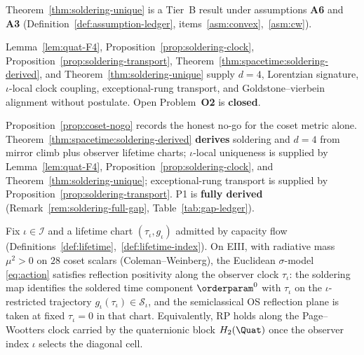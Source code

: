 \begin{remark}
\label{rem:soldering-tier}
Theorem~\ref{thm:soldering-unique} is a Tier~B result under assumptions
\textbf{A6} and \textbf{A3} (Definition~\ref{def:assumption-ledger},
items~\ref{asm:convex},~\ref{asm:cw}).
\end{remark}

\begin{remark}
\label{rem:soldering-full-gap}
Lemma~\ref{lem:quat-F4}, Proposition~\ref{prop:soldering-clock},
Proposition~\ref{prop:soldering-transport},
Theorem~\ref{thm:spacetime:soldering-derived}, and
Theorem~\ref{thm:soldering-unique} supply $d=4$, Lorentzian signature,
$\iota$-local clock coupling, exceptional-rung transport, and
Goldstone--vierbein alignment without postulate. Open Problem~\textbf{O2} is
\textbf{closed}.
\end{remark}

\begin{remark}
Proposition~\ref{prop:coset-nogo} records the honest no-go for the coset
metric alone. Theorem~\ref{thm:spacetime:soldering-derived} \textbf{derives}
soldering and $d=4$ from mirror climb plus observer lifetime charts;
$\iota$-local uniqueness is supplied by Lemma~\ref{lem:quat-F4},
Proposition~\ref{prop:soldering-clock}, and
Theorem~\ref{thm:soldering-unique}; exceptional-rung transport is supplied
by Proposition~\ref{prop:soldering-transport}. P1 is \textbf{fully derived}
(Remark~\ref{rem:soldering-full-gap}, Table~\ref{tab:gap-ledger}).
\end{remark}

\begin{theorem}
\label{thm:rp}
Fix $\iota\in\mathcal{I}$ and a lifetime chart
$(\tau_\iota,g_\iota)$ admitted by capacity flow
(Definitions~\ref{def:lifetime},~\ref{def:lifetime-index}). On EIII, with
radiative mass $\mu^2>0$ on $28$ coset scalars (Coleman--Weinberg), the
Euclidean $\sigma$-model \eqref{eq:action} satisfies reflection positivity
along the observer clock $\tau_\iota$: the soldering map identifies the
soldered time component $\orderparam^0$ with $\tau_\iota$ on the
$\iota$-restricted trajectory $g_\iota(\tau_\iota)\in\mathcal{S}_\iota$, and
the semiclassical OS reflection plane is taken at fixed $\tau_\iota=0$ in
that chart. Equivalently, RP holds along the Page--Wootters clock carried by
the quaternionic block $H_2(\Quat)$ once the observer index $\iota$ selects
the diagonal cell.
\end{theorem}

